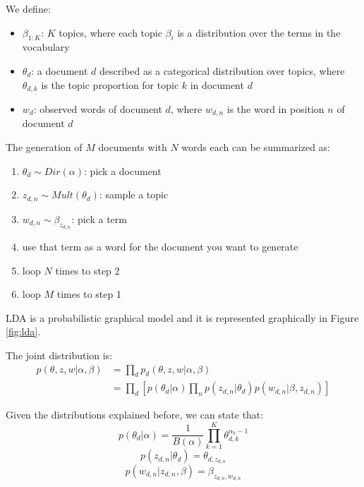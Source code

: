 We define:
\begin{itemize}
    \item $\beta_{1:K}$: $K$ topics, where each topic $\beta_i$ is a distribution over the terms in the vocabulary
    \item $\theta_d$: a document $d$ described as a categorical distribution over topics, where $\theta_{d,k}$ is the topic proportion for topic $k$ in document $d$
    \item $w_{d}$: observed words of document $d$, where $w_{d,n}$ is the word in position $n$ of document $d$
\end{itemize}

The generation of $M$ documents with $N$ words each can be summarized as:
\begin{enumerate}
    \item $\theta_d \sim Dir(\alpha)$: pick a document
    \item $z_{d,n} \sim Mult(\theta_d)$: sample a topic
    \item $w_{d,n} \sim \beta_{z_{d,n}}$: pick a term
    \item use that term as a word for the document you want to generate
    \item loop $N$ times to step 2
    \item loop $M$ times to step 1
\end{enumerate}

LDA is a probabilistic graphical model and it is represented graphically in Figure \ref{fig:lda}.

The joint distribution is:
\begin{equation*}
    \begin{split}
        p(\theta, z, w | \alpha, \beta) & = \prod_d p_d(\theta, z, w | \alpha, \beta) \\
        & = \prod_d [p(\theta_d | \alpha) \prod_n p(z_{d,n} | \theta_d) p(w_{d, n} | \beta, z_{d,n})]
    \end{split}
\end{equation*}

Given the distributions explained before, we can state that:
$$ p(\theta_d | \alpha) = \frac{1}{B(\alpha)} \prod_{k=1}^K \theta_{d,k}^{\alpha_k - 1}$$
$$ p(z_{d,n} | \theta_d) = \theta_{d, z_{d,n}} $$
$$ p(w_{d,n} | z_{d,n}, \beta) = \beta_{z_{d,n},w_{d,n}} $$

